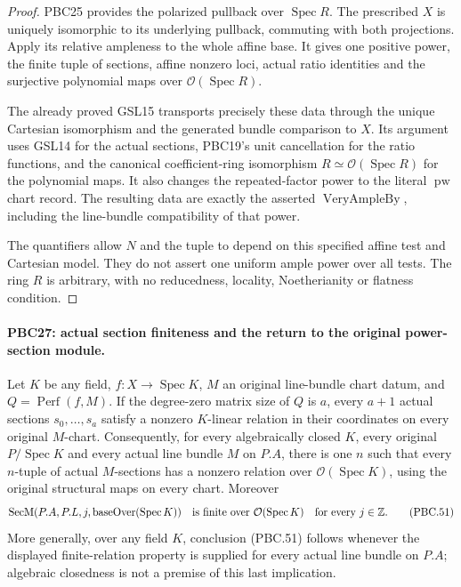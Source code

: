 \begin{proof}
PBC25 provides the polarized pullback over
$\operatorname{Spec}R$.  The prescribed $X$ is uniquely
isomorphic to its underlying pullback, commuting with both
projections.  Apply its relative ampleness to the whole affine
base.  It gives one positive power, the finite tuple of
sections, affine nonzero loci, actual ratio identities and
the surjective polynomial maps over
$\mathcal O(\operatorname{Spec}R)$.

The already proved GSL15 transports precisely these data
through the unique Cartesian isomorphism and the generated
bundle comparison to $X$.  Its argument uses GSL14 for
the actual sections, PBC19's unit cancellation for the
ratio functions, and the canonical coefficient-ring
isomorphism $R\simeq\mathcal O(\operatorname{Spec}R)$ for
the polynomial maps.  It also changes the repeated-factor
power to the literal $\operatorname{pw}$ chart record.
The resulting data are exactly the asserted
$\operatorname{VeryAmpleBy}$, including the line-bundle
compatibility of that power.

The quantifiers allow $N$ and the tuple to depend on this
specified affine test and Cartesian model.  They do not
assert one uniform ample power over all tests.
The ring $R$ is arbitrary, with no reducedness, locality,
Noetherianity or flatness condition.
\end{proof}

\paragraph{PBC27: actual section finiteness and the return to the original power-section module.}
\label{claim:PBC27}
Let $K$ be any field, $f:X\to\operatorname{Spec}K$, $M$
an original line-bundle chart datum, and
$Q=\operatorname{Perf}(f,M)$.
If the degree-zero matrix size of $Q$ is $a$, every
$a+1$ actual sections $s_0,\ldots,s_a$ satisfy a nonzero
$K$-linear relation in their coordinates on every original
$M$-chart.
Consequently, for every algebraically closed $K$, every
original $P/\operatorname{Spec}K$ and every actual line
bundle $M$ on $P.A$, there is one $n$ such that every
$n$-tuple of actual $M$-sections has a nonzero relation
over $\mathcal O(\operatorname{Spec}K)$, using the original
structural maps on every chart.  Moreover
\[
 \operatorname{SecM}(P.A,P.L,j,\operatorname{baseOver}(\operatorname{Spec}K))
 \quad\hbox{is finite over }\mathcal O(\operatorname{Spec}K)
       \quad\hbox{for every }j\in\mathbb Z.
                                                        \tag{PBC.51}
\]
More generally, over any field $K$, conclusion (PBC.51)
follows whenever the displayed finite-relation property is
supplied for every actual line bundle on $P.A$; algebraic
closedness is not a premise of this last implication.

